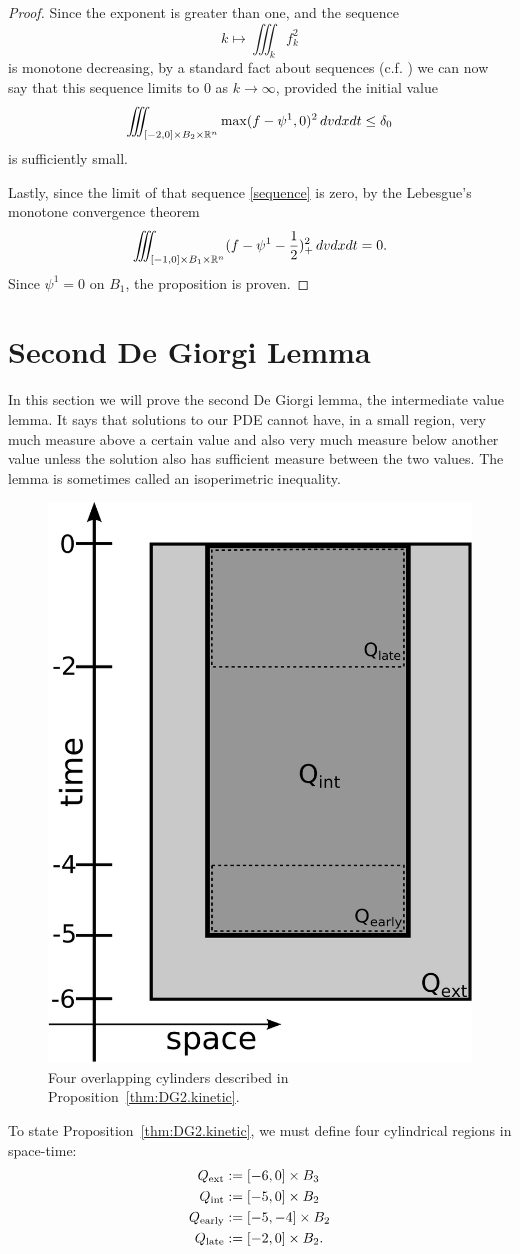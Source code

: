 \begin{proof}
Since the exponent is greater than one, and the sequence
\begin{equation}\label{sequence} 
k \mapsto \iiint_k f_k^2 
\end{equation}
is monotone decreasing, by a standard fact about sequences (c.f. \cite{Va.dg}) we can now say that this sequence limits to 0 as $k \to \infty$, provided the initial value
\[ \iiint_{[-2,0]\times B_2 \times \mathbb{R}^n} \max(f-\psi^1,0)^2 \,dvdxdt \leq \delta_0 \]
is sufficiently small.  

Lastly, since the limit of that sequence \eqref{sequence} is zero, by the Lebesgue's monotone convergence theorem
\[ \iiint_{[-1,0] \times B_1 \times \mathbb{R}^n} (f - \psi^1 - \frac{1}{2})_+^2 \,dvdxdt = 0. \]
Since $\psi^1 = 0$ on $B_1$, the proposition is proven.  

\end{proof}


\section{Second De Giorgi Lemma}\label{sec:DG2.kinetic}

In this section we will prove the second De Giorgi lemma, the intermediate value lemma.  It says that solutions to our PDE cannot have, in a small region, very much measure above a certain value and also very much measure below another value unless the solution also has sufficient measure between the two values.  The lemma is sometimes called an isoperimetric inequality. 

\begin{figure}[h]
\includegraphics[width=.25 \textwidth]{NFP-diagram-Q-3}
\caption{Four overlapping cylinders described in Proposition~\ref{thm:DG2.kinetic}.}
\end{figure}

To state Proposition~\ref{thm:DG2.kinetic}, we must define four cylindrical regions in space-time:
\begin{align*} 
{Q_\textrm{ext}} &:= [-6,0]\times B_3 \\
{Q_\textrm{int}} &:= [-5,0]\times B_2 \\
{Q_\textrm{early}} &:= [-5,-4]\times B_2 \\
{Q_\textrm{late}} &:= [-2,0]\times B_2. \\
\end{align*}

